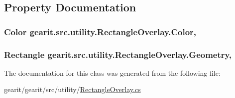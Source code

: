\subsection{Property Documentation}
\hypertarget{classgearit_1_1src_1_1utility_1_1_rectangle_overlay_a429feec3fafa78d4189caa203ad6ad7e}{
\subsubsection[{Color}]{\setlength{\rightskip}{0pt plus 5cm}Color gearit.\+src.\+utility.\+Rectangle\+Overlay.\+Color\hspace{0.3cm}{\ttfamily [get]}, {\ttfamily [set]}}}\label{classgearit_1_1src_1_1utility_1_1_rectangle_overlay_a429feec3fafa78d4189caa203ad6ad7e}
\hypertarget{classgearit_1_1src_1_1utility_1_1_rectangle_overlay_ad57ed4bcfb9a6271e1cc9e9ada91250c}{
\subsubsection[{Geometry}]{\setlength{\rightskip}{0pt plus 5cm}Rectangle gearit.\+src.\+utility.\+Rectangle\+Overlay.\+Geometry\hspace{0.3cm}{\ttfamily [get]}, {\ttfamily [set]}}}\label{classgearit_1_1src_1_1utility_1_1_rectangle_overlay_ad57ed4bcfb9a6271e1cc9e9ada91250c}


The documentation for this class was generated from the following file\+:\begin{DoxyCompactItemize}
\item 
gearit/gearit/src/utility/\hyperlink{_rectangle_overlay_8cs}{Rectangle\+Overlay.\+cs}\end{DoxyCompactItemize}

